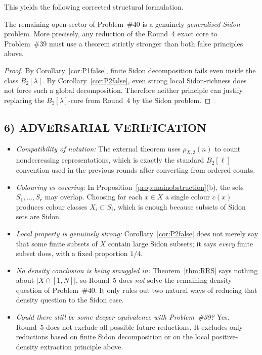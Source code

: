 This yields the following corrected structural formulation.

\begin{corollary}\label{cor:corrected}
The remaining open sector of Problem~\#40 is a genuinely \emph{generalised Sidon} problem.
More precisely, any reduction of the Round~4 exact core to Problem~\#39 must use a theorem
strictly stronger than both false principles above.
\end{corollary}

\begin{proof}
By Corollary~\ref{cor:P1false}, finite Sidon decomposition fails even inside the class $B_2[\lambda]$.
By Corollary~\ref{cor:P2false}, even strong local Sidon-richness does not force such a
global decomposition. Therefore neither principle can justify replacing the $B_2[\lambda]$-core
from Round~4 by the Sidon problem.
\end{proof}

\subsection*{6) ADVERSARIAL VERIFICATION}
\begin{itemize}
\item \emph{Compatibility of notation:} The external theorem uses $\rho_{X,2}(n)$ to count
nondecreasing representations, which is exactly the standard $B_2[\ell]$ convention used in the
previous rounds after converting from ordered counts.

\item \emph{Colouring vs covering:} In Proposition~\ref{prop:mainobstruction}(b), the sets
$S_1,\dots,S_r$ may overlap. Choosing for each $x\in X$ a single colour $c(x)$ produces colour
classes $X_i\subset S_i$, which is enough because subsets of Sidon sets are Sidon.

\item \emph{Local property is genuinely strong:} Corollary~\ref{cor:P2false} does not merely say
that some finite subsets of $X$ contain large Sidon subsets; it says \emph{every} finite subset does,
with a fixed proportion $1/4$.

\item \emph{No density conclusion is being smuggled in:} Theorem~\ref{thm:RRS} says nothing about
$|X\cap[1,N]|$, so Round~5 does \emph{not} solve the remaining density question of Problem~\#40.
It only rules out two natural ways of reducing that density question to the Sidon case.

\item \emph{Could there still be some deeper equivalence with Problem~\#39?} Yes. Round~5 does not
exclude all possible future reductions. It excludes only reductions based on finite Sidon
decomposition or on the local positive-density extraction principle above.
\end{itemize}

